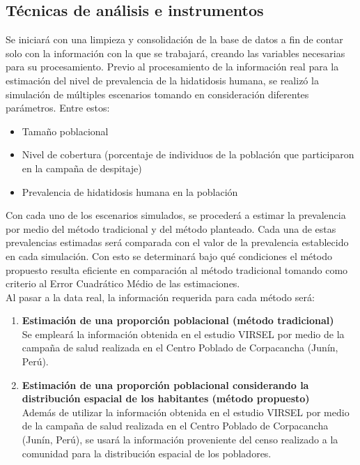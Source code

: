 \subsection{Técnicas de análisis e instrumentos}
Se iniciará con una limpieza y consolidación de la base de datos a fin de contar solo con la información con la que se trabajará, creando las variables necesarias para su procesamiento. Previo al procesamiento de la información real para la estimación del nivel de prevalencia de la hidatidosis humana, se realizó la simulación de múltiples escenarios tomando en consideración diferentes parámetros. Entre estos:
\begin{itemize}[noitemsep,nolistsep]
    \item Tamaño poblacional
    \item Nivel de cobertura (porcentaje de individuos de la población que participaron en la campaña de despitaje)
    \item Prevalencia de hidatidosis humana en la población
\end{itemize}

Con cada uno de los escenarios simulados, se procederá a estimar la prevalencia por medio del método tradicional y del método planteado. Cada una de estas prevalencias estimadas será comparada con el valor de la prevalencia establecido en cada simulación. Con esto se determinará bajo qué condiciones el método propuesto resulta eficiente en comparación al método tradicional tomando como criterio al Error Cuadrático Médio de las estimaciones.\\

Al pasar a la data real, la información requerida para cada método será:
\begin{enumerate}
	\item \textbf{Estimación de una proporción poblacional (método tradicional)}\\ Se empleará la información obtenida en el estudio VIRSEL por medio de la campaña de salud realizada en el Centro Poblado de Corpacancha (Junín, Perú).
	\item \textbf{Estimación de una proporción poblacional considerando la distribución espacial de los habitantes (método propuesto)}\\ Además de utilizar la información obtenida en el estudio VIRSEL por medio de la campaña de salud realizada en el Centro Poblado de Corpacancha (Junín, Perú), se usará la información proveniente del censo realizado a la comunidad para la distribución espacial de los pobladores.
\end{enumerate}

